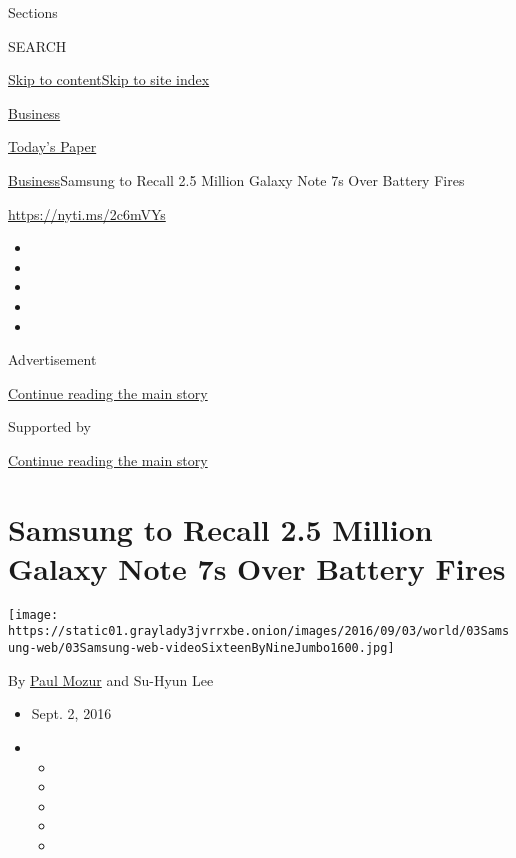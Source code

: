 Sections

SEARCH

\protect\hyperlink{site-content}{Skip to
content}\protect\hyperlink{site-index}{Skip to site index}

\href{https://www.nytimes3xbfgragh.onion/section/business}{Business}

\href{https://myaccount.nytimes3xbfgragh.onion/auth/login?response_type=cookie\&client_id=vi}{}

\href{https://www.nytimes3xbfgragh.onion/section/todayspaper}{Today's
Paper}

\href{/section/business}{Business}\textbar{}Samsung to Recall 2.5
Million Galaxy Note 7s Over Battery Fires

\url{https://nyti.ms/2c6mVYs}

\begin{itemize}
\item
\item
\item
\item
\item
\end{itemize}

Advertisement

\protect\hyperlink{after-top}{Continue reading the main story}

Supported by

\protect\hyperlink{after-sponsor}{Continue reading the main story}

\hypertarget{samsung-to-recall-25-million-galaxy-note-7s-over-battery-fires}{%
\section{Samsung to Recall 2.5 Million Galaxy Note 7s Over Battery
Fires}\label{samsung-to-recall-25-million-galaxy-note-7s-over-battery-fires}}

\texttt{[image: https://static01.graylady3jvrrxbe.onion/images/2016/09/03/world/03Samsung-web/03Samsung-web-videoSixteenByNineJumbo1600.jpg]}

By \href{https://www.nytimes3xbfgragh.onion/by/paul-mozur}{Paul Mozur}
and Su-Hyun Lee

\begin{itemize}
\item
  Sept. 2, 2016
\item
  \begin{itemize}
  \item
  \item
  \item
  \item
  \item
  \end{itemize}
\end{itemize}


